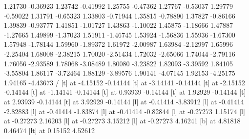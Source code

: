           1.21730 -0.36923
          1.23742 -0.41992
          1.25755 -0.47362
          1.27767 -0.53037
          1.29779 -0.59022
          1.31791 -0.65323
          1.33803 -0.71944
          1.35815 -0.78890
          1.37827 -0.86166
          1.39839 -0.93777
          1.41851 -1.01727
          1.43863 -1.10022
          1.45875 -1.18666
          1.47887 -1.27665
          1.49899 -1.37023
          1.51911 -1.46745
          1.53924 -1.56836
          1.55936 -1.67300
          1.57948 -1.78144
          1.59960 -1.89372
          1.61972 -2.00987
          1.63984 -2.12997
          1.65996 -2.25404
          1.68008 -2.38215
          1.70020 -2.51434
          1.72032 -2.65066
          1.74044 -2.79116
          1.76056 -2.93589
          1.78068 -3.08489
          1.80080 -3.23822
          1.82093 -3.39592
          1.84105 -3.55804
          1.86117 -3.72464
          1.88129 -3.89576
          1.90141 -4.07145
          1.92153 -4.25175
          1.94165 -4.43673
          /
           [t] at -4.15152 -0.14144
           [t] at -3.14141 -0.14144
           [t] at -2.15152 -0.14144
           [t] at -1.14141 -0.14144
           [t] at 0.93939 -0.14144
           [t] at 1.92929 -0.14144
           [t] at 2.93939 -0.14144
           [t] at 3.92929 -0.14144
           [l] at -0.41414 -3.83912
           [l] at -0.41414 -2.82883
           [l] at -0.41414 -1.83874
           [l] at -0.41414 -0.82844
           [l] at -0.27273 1.15174
           [l] at -0.27273 2.16203
           [l] at -0.27273 3.15212
           [l] at -0.27273 4.16241
           [b] at 4.81818 0.46474
           [lt] at 0.15152 4.52612
         \endpicture